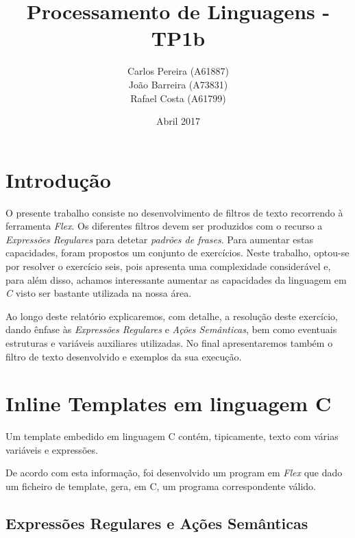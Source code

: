 \documentclass{article}
\title{\textbf{Processamento de Linguagens - TP1b}}
\author{\begin{tabular}{c}
            \textbf{} Carlos Pereira (A61887) \\ João Barreira (A73831) \\ Rafael Costa (A61799)
        \end{tabular}
       }
\date{Abril 2017}
\begin{document}
\maketitle

\newpage
\renewcommand*\contentsname{Índice}

\tableofcontents



\newpage
\section{Introdução}

O presente trabalho consiste no desenvolvimento de filtros de texto recorrendo à ferramenta \emph{Flex}. Os diferentes filtros devem ser produzidos com o recurso a \emph{Expressões Regulares} para detetar \emph{padrões de frases}. Para aumentar estas capacidades, foram propostos um conjunto de exercícios. Neste trabalho, optou-se por resolver o exercício seis, pois apresenta uma complexidade considerável e, para além disso, achamos interessante aumentar as capacidades da linguagem em \emph{C} visto ser bastante utilizada na nossa área.

Ao longo deste relatório explicaremos, com detalhe, a resolução deste exercício, dando ênfase às \emph{Expressões Regulares} e \emph{Ações Semânticas}, bem como eventuais estruturas e variáveis auxiliares utilizadas. No final apresentaremos também o filtro de texto desenvolvido e exemplos da sua execução.



\newpage
\section{Inline Templates em linguagem C}

Um template embedido em linguagem C contém, tipicamente, texto com várias variáveis e expressões.

De acordo com esta informação, foi desenvolvido um program em \emph{Flex} que dado um ficheiro de template, gera, em C, um programa correspondente válido.


\subsection{Expressões Regulares e Ações Semânticas}
\end{document}
